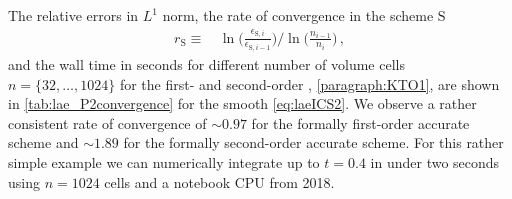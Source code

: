 The relative errors in $L^1$ norm, the rate of convergence in the scheme $\mathrm{S}$
\begin{align}
	r_\mathrm{S} \equiv \, & \ln \big( \tfrac{\epsilon_{\mathrm{S}, i}}{\epsilon_{\mathrm{S}, i - 1}} \big)/\ln \big( \tfrac{n_{i - 1}}{n_{i}} \big) \, ,\label{eq:rateS}
\end{align}
and the wall time in seconds for different number of volume cells $n=\{32,\ldots,1024\}$ for the first- and second-order \ktScheme{}, \cf{} \cref{paragraph:KTO1}, are shown in \cref{tab:lae_P2convergence} for the smooth \ic{} \eqref{eq:laeICS2}.
We observe a rather consistent rate of convergence of $\sim0.97$ for the formally first-order accurate scheme and $\sim1.89$ for the formally second-order accurate scheme.
For this rather simple example we can numerically integrate up to $t=0.4$ in under two seconds using $n=1024$ cells and a notebook CPU from 2018.


